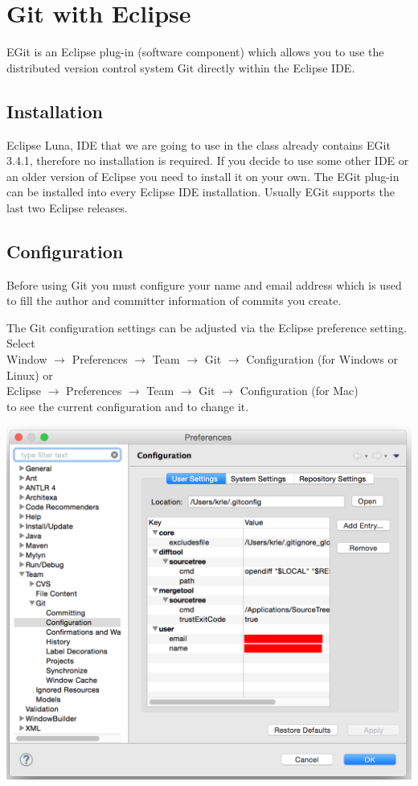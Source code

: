 \documentclass{article}
\begin{document}
\section{Git with Eclipse}

EGit is an Eclipse plug-in (software component) which allows you to
use the distributed version control system Git directly within the
Eclipse IDE. 

\subsection{Installation}
Eclipse Luna, IDE that we are going to use in the class already contains
EGit 3.4.1, therefore no installation is required. If you decide to
use some other IDE or an older version of Eclipse you need to install
it on your own.
The EGit plug-in can be installed into every Eclipse IDE
installation. Usually EGit supports the last two Eclipse releases.

\subsection{Configuration}

Before using Git you must configure your name and email address which
is used to fill the author and committer information of commits you
create. 

The Git configuration settings can be adjusted via the Eclipse
preference setting. 
Select \\
Window $\rightarrow$ Preferences $\rightarrow$ Team
$\rightarrow$ Git $\rightarrow$ Configuration  (for Windows or Linux)
or\\
Eclipse $\rightarrow$ Preferences $\rightarrow$ Team
$\rightarrow$ Git $\rightarrow$ Configuration (for Mac)\\
to see the current configuration and to change it. 

\begin{center}
\includegraphics[scale=0.5]{figures/s3.png}
\end{center}
\end{document}
